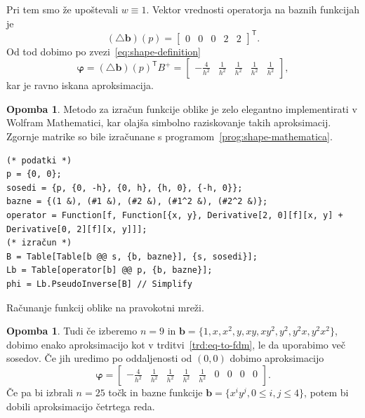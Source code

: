 \documentclass[a4paper,twoside]{article}
\theoremstyle{definition} %
\newtheorem{opomba}[definicija]{Opomba}
\theoremstyle{plain} %
\numberwithin{equation}{section}
\newcommand{\T}{\mathsf{T}}
\renewcommand{\b}{\boldsymbol}
\renewcommand{\phi}{\varphi}
\begin{document}
Pri tem smo že upoštevali $w \equiv 1$.
Vektor vrednosti operatorja na baznih funkcijah je
\[
  (\triangle \b{b})(p) =
\begin{bmatrix}
  0 & 0 & 0 & 2 & 2
\end{bmatrix}^\T.
\]
Od tod dobimo po zvezi~\eqref{eq:shape-definition}
\[
  \b\phi = (\triangle \b b)(p)^\T B^{+} =
  \begin{bmatrix}
    -\frac{4}{h^2} & \frac{1}{h^2} & \frac{1}{h^2} & \frac{1}{h^2} &
    \frac{1}{h^2}
  \end{bmatrix},
\]
kar je ravno iskana aproksimacija.
\endproof
\begin{opomba}
  Metodo za izračun funkcije oblike je zelo elegantno implementirati v
  Wolfram Mathematici, kar olajša simbolno raziskovanje takih aproksimacij.
  Zgornje matrike so bile izračunane s programom~\ref{prog:shape-mathematica}.

  \begin{listing}[!h]
    \vspace{-1ex}
  \begin{verbatim}
(* podatki *)
p = {0, 0};
sosedi = {p, {0, -h}, {0, h}, {h, 0}, {-h, 0}};
bazne = {(1 &), (#1 &), (#2 &), (#1^2 &), (#2^2 &)};
operator = Function[f, Function[{x, y}, Derivative[2, 0][f][x, y] + Derivative[0, 2][f][x, y]]];
(* izračun *)
B = Table[Table[b @@ s, {b, bazne}], {s, sosedi}];
Lb = Table[operator[b] @@ p, {b, bazne}];
phi = Lb.PseudoInverse[B] // Simplify
  \end{verbatim}
  \vspace{-3ex}
  \caption{Računanje funkcij oblike na pravokotni mreži.}
  \label{prog:shape-mathematica}
  \end{listing}
\end{opomba}
\begin{opomba}
  \label{op:fdm-9}
  Tudi če izberemo $n=9$ in $\b b = \{1, x, x^2, y, xy, xy^2, y^2, y^2 x, y^2
  x^2 \}$, dobimo enako aproksimacijo kot v trditvi~\ref{trd:eq-to-fdm}, le da
  uporabimo več sosedov. Če jih uredimo po oddaljenosti od $(0, 0)$ dobimo
  aproksimacijo
  \begin{equation}
    \b\phi =  \begin{bmatrix}
    -\frac{4}{h^2} & \frac{1}{h^2} & \frac{1}{h^2} & \frac{1}{h^2} &
    \frac{1}{h^2} & 0 & 0 & 0 & 0
  \end{bmatrix}.
    \label{eq:shape-mon9}
  \end{equation}
 Če pa bi izbrali $n=25$ točk in bazne funkcije $\b b = \{x^iy^j, 0 \leq i, j
 \leq 4 \}$, potem bi dobili aproksimacijo četrtega reda.
\end{opomba}
\end{document}
